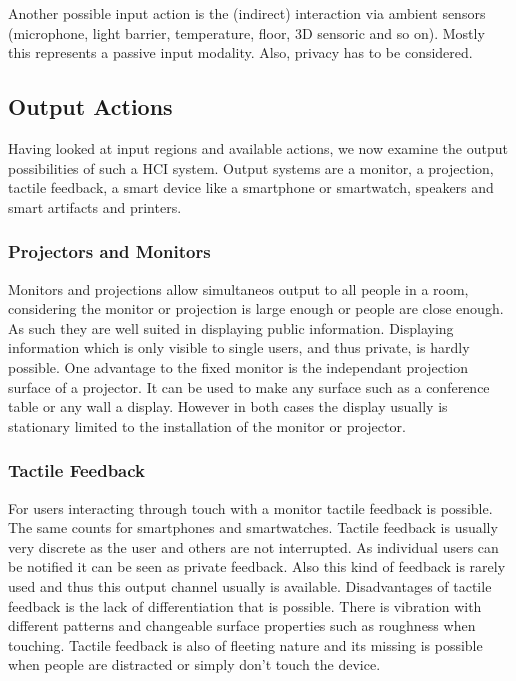 \documentclass{acm_proc_article-sp}
\begin{document}
Another possible input action is the (indirect) interaction via ambient sensors (microphone, light barrier, temperature, floor, 3D sensoric and so on).
Mostly this represents a passive input modality. Also, privacy has to be considered.

\subsection{Output Actions}

Having looked at input regions and available actions, we now examine the output possibilities of such a HCI system.
Output systems are a monitor, a projection, tactile feedback, a smart device like a smartphone or smartwatch, speakers and smart artifacts and printers.

\subsubsection{Projectors and Monitors} 
Monitors and projections allow simultaneos output to all people in a room, considering the monitor or projection is large enough or people are close enough.
As such they are well suited in displaying public information.
Displaying information which is only visible to single users, and thus private, is hardly possible.
One advantage to the fixed monitor is the independant projection surface of a projector.
It can be used to make any surface such as a conference table or any wall a display.
However in both cases the display usually is stationary limited to the installation of the monitor or projector.

\subsubsection{Tactile Feedback}
For users interacting through touch with a monitor tactile feedback is possible.
The same counts for smartphones and smartwatches.
Tactile feedback is usually very discrete as the user and others are not interrupted.
As individual users can be notified it can be seen as private feedback.
Also this kind of feedback is rarely used and thus this output channel usually is available.
Disadvantages of tactile feedback is the lack of differentiation that is possible.
There is vibration with different patterns and changeable surface properties such as roughness when touching.
Tactile feedback is also of fleeting nature and its missing is possible when people are distracted or simply don’t touch the device.
\end{document}
